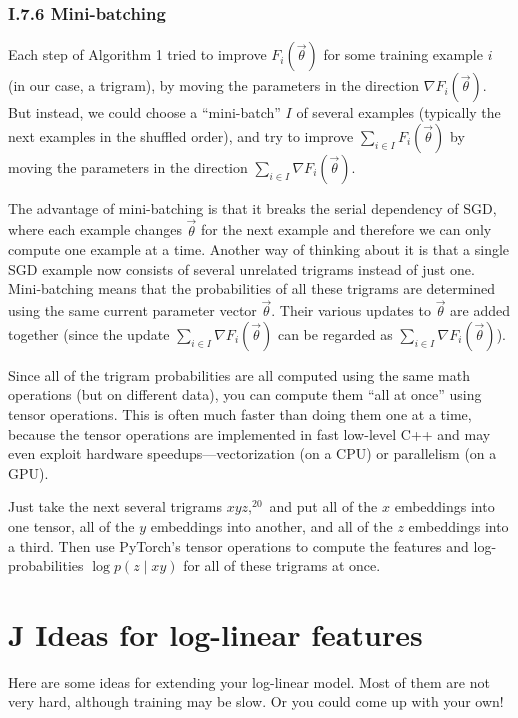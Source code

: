\documentclass[12pt]{article}
\theoremstyle{plain}
\theoremstyle{definition}
\theoremstyle{remark}
\begin{document}
\subsubsection*{I.7.6 Mini-batching}

Each step of Algorithm 1 tried to improve $F_i(\vec{\theta})$ for some training example $i$ (in our case, a trigram), by moving the parameters in the direction $\nabla F_i(\vec{\theta})$. But instead, we could choose a “mini-batch” $I$ of several examples (typically the next examples in the shuffled order), and try to improve $\sum_{i \in I} F_i(\vec{\theta})$ by moving the parameters in the direction $\sum_{i \in I} \nabla F_i(\vec{\theta})$.

The advantage of mini-batching is that it breaks the serial dependency of SGD, where each example changes $\vec{\theta}$ for the next example and therefore we can only compute one example at a time. Another way of thinking about it is that a single SGD example now consists of several unrelated trigrams instead of just one. Mini-batching means that the probabilities of all these trigrams are determined using the same current parameter vector $\vec{\theta}$. Their various updates to $\vec{\theta}$ are added together (since the update $\sum_{i \in I} \nabla F_i(\vec{\theta})$ can be regarded as $\sum_{i \in I} \nabla F_i(\vec{\theta})$).

Since all of the trigram probabilities are all computed using the same math operations (but on different data), you can compute them “all at once” using tensor operations. This is often much faster than doing them one at a time, because the tensor operations are implemented in fast low-level C++ and may even exploit hardware speedups—vectorization (on a CPU) or parallelism (on a GPU).

Just take the next several trigrams $xyz,^{20}$ and put all of the $x$ embeddings into one tensor, all of the $y$ embeddings into another, and all of the $z$ embeddings into a third. Then use PyTorch’s tensor operations to compute the features and log-probabilities $\log p(z \mid xy)$ for all of these trigrams at once.

\section*{J Ideas for log-linear features}

Here are some ideas for extending your log-linear model. Most of them are not very hard, although training may be slow. Or you could come up with your own!
\end{document}
